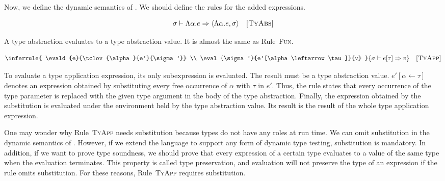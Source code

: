 Now, we define the dynamic semantics of \lang. We should define the rules for
the added expressions.


\vspace{-1em}

\[
  \sigma\vdash\Lambda\alpha.e\Rightarrow\langle\Lambda\alpha.e,\sigma\rangle
  \quad\textsc{[TyAbs]}
\]

A type abstraction evaluates to a type abstraction value. It is almost the same
as Rule~\textsc{Fun}.


\vspace{-1em}

\[
  \inferrule
  { \evald{e}{\tclov{\alpha}{e'}{\sigma'}} \\
    \eval{\sigma'}{e'[\alpha\leftarrow\tau]}{v} }
  { \evald{\etapp{e}{\tau}}{v} }
  \quad\textsc{[TyApp]}
\]

To evaluate a type application expression, its only subexpression is evaluated.
The result must be a type abstraction value. $e'[\alpha\leftarrow\tau]$ denotes
an expression obtained by substituting every free occurrence of $\alpha$ with $\tau$
in $e'$.
Thus, the rule states that every occurrence of the type parameter is replaced with
the given type argument in the body of the type abstraction. Finally, the
expression obtained by the substitution is evaluated under the environment held
by the type abstraction value. Its result is the result of the whole type
application expression.

One may wonder why Rule~\textsc{TyApp} needs substitution because types do not
have any roles at run time. We can omit substitution in the dynamic semantics of
\lang. However, if we extend the language to support any form of dynamic type
testing, substitution is mandatory. In addition, if we want to prove type
soundness, we should prove that every expression of a certain type evaluates to a
value of the same type when the evaluation terminates. This property is called
type preservation, and evaluation will not preserve the type of an expression if
the rule omits substitution. For these reasons, Rule~\textsc{TyApp} requires
substitution.

